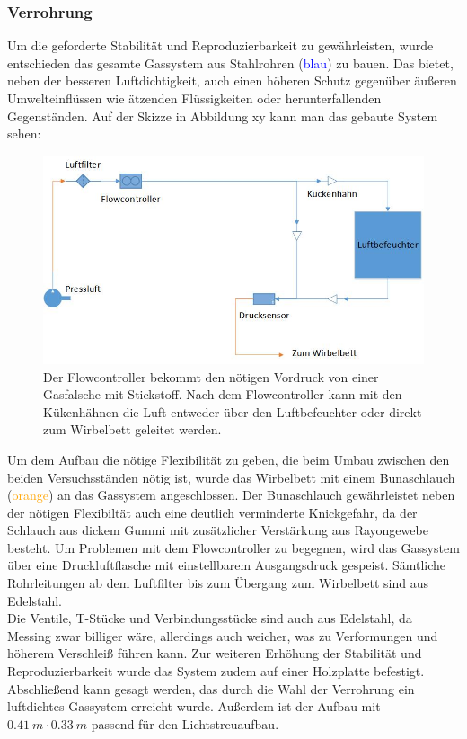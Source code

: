 \subsubsection{Verrohrung}

Um die geforderte Stabilität und Reproduzierbarkeit zu gewährleisten, wurde entschieden das gesamte Gassystem aus Stahlrohren (\textcolor{blue}{blau}) zu bauen. Das bietet, neben der besseren Luftdichtigkeit, auch einen höheren Schutz gegenüber äußeren Umwelteinflüssen wie ätzenden Flüssigkeiten oder herunterfallenden Gegenständen.
Auf der Skizze in Abbildung xy kann man das gebaute System sehen:
\hfill \\

\begin{figure}[h]
	\begin{center}
		\includegraphics[scale=0.6]{Aufbau_Gassystem.jpg}
		\caption[Schema Gassystem]{Der Flowcontroller bekommt den nötigen Vordruck von einer Gasfalsche mit Stickstoff. Nach dem Flowcontroller kann mit den Kükenhähnen die Luft entweder über den Luftbefeuchter oder direkt zum Wirbelbett geleitet werden.}
	\end{center}
\end{figure}


Um dem Aufbau die nötige Flexibilität zu geben, die beim Umbau zwischen den beiden Versuchsständen nötig ist, wurde das Wirbelbett mit einem Bunaschlauch (\textcolor{orange}{orange}) an das Gassystem angeschlossen. Der Bunaschlauch gewährleistet neben der nötigen Flexibiltät auch eine deutlich verminderte Knickgefahr, da der Schlauch aus dickem Gummi mit zusätzlicher Verstärkung aus Rayongewebe besteht.
Um Problemen mit dem Flowcontroller zu begegnen, wird das Gassystem über eine Druckluftflasche mit einstellbarem Ausgangsdruck gespeist. Sämtliche Rohrleitungen ab dem Luftfilter bis zum Übergang zum Wirbelbett sind aus Edelstahl. \\
Die Ventile, T-Stücke und Verbindungsstücke sind auch aus Edelstahl, da Messing zwar billiger wäre, allerdings auch weicher, was zu Verformungen und höherem Verschleiß führen kann. Zur weiteren Erhöhung der Stabilität und Reproduzierbarkeit wurde das System zudem auf einer Holzplatte befestigt. \\
Abschließend kann gesagt werden, das durch die Wahl der Verrohrung ein luftdichtes Gassystem erreicht wurde. Außerdem ist der Aufbau mit $\SI{0,41}{m} \cdot \SI{0,33}{m}$ passend für den Lichtstreuaufbau.


